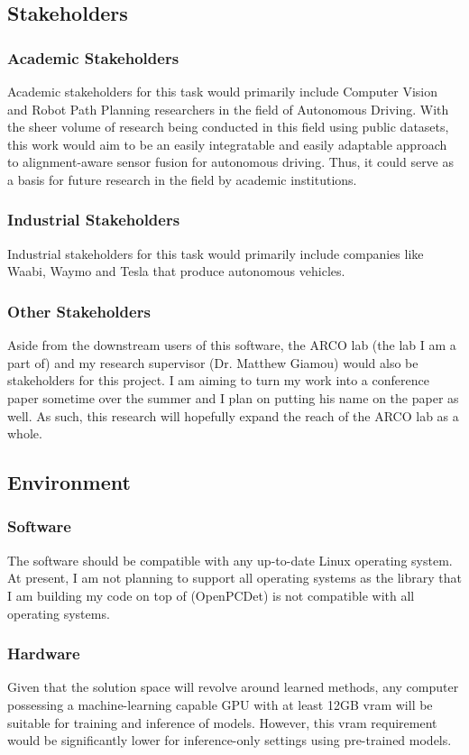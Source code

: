 \documentclass{article}
\begin{document}
\subsection{Stakeholders}
\subsubsection{Academic Stakeholders}
Academic stakeholders for this task would primarily include Computer Vision and Robot Path Planning researchers
in the field of Autonomous Driving. With the sheer volume of research being conducted in this field using public datasets,
this work would aim to be an easily integratable and easily adaptable approach to alignment-aware sensor fusion for autonomous
driving. Thus, it could serve as a basis for future research in the field by academic institutions. 

\subsubsection{Industrial Stakeholders}
Industrial stakeholders for this task would primarily include companies like Waabi, Waymo and Tesla that produce
autonomous vehicles. 

\subsubsection{Other Stakeholders}
Aside from the downstream users of this software, the ARCO lab (the lab I am a part of) and my research supervisor (Dr. Matthew Giamou) would also be stakeholders for this project.
I am aiming to turn my work into a conference paper sometime over the summer and I plan on putting his name on the paper as well.
As such, this research will hopefully expand the reach of the ARCO lab as a whole.  

\subsection{Environment}
\subsubsection{Software}
The software should be compatible with any up-to-date Linux operating system. At present, I am not planning to support 
all operating systems as the library that I am building my code on top of (OpenPCDet) is not compatible with all operating systems.


\subsubsection{Hardware}
Given that the solution space will revolve around learned methods, any computer possessing a machine-learning capable
GPU with at least 12GB vram will be suitable for training and inference of models. However, this vram requirement would
be significantly lower for inference-only settings using pre-trained models.
\end{document}
